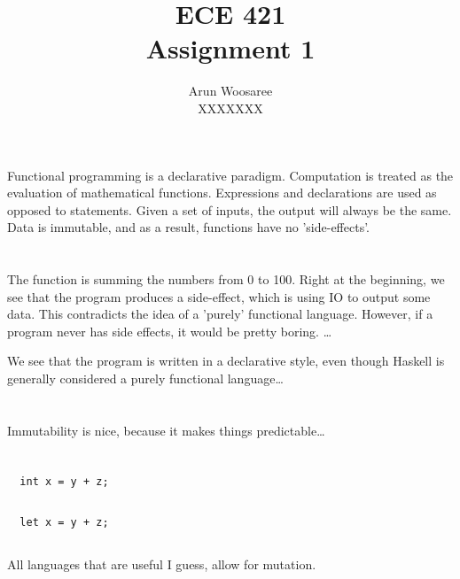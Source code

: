 \documentclass[letterpaper]{article}
\title{ECE 421 \\
Assignment 1}
\author{Arun Woosaree\\
XXXXXXX
}
\begin{document}
\maketitle %

\section{}
Functional programming is a declarative paradigm.
Computation is treated as the evaluation of mathematical functions.
Expressions and declarations are used as opposed to statements.
Given a set of inputs, the output will always be the same.
Data is immutable, and as a result,
functions have no 'side-effects'.

\section{}
The function is summing the numbers from 0 to 100.
Right at the beginning, we see that the program produces a side-effect, which
is using IO to output some data. This contradicts the idea of a 'purely'
functional language. However, if a program never has side effects, it would be
pretty boring. \dots {}

We see that the program is written in a declarative style, even though Haskell
is generally considered a purely functional language\dots


\section{}
Immutability is nice, because it makes things predictable\dots

\section{}
\begin{verbatim}
  int x = y + z;
\end{verbatim}

\subsection{}
\begin{verbatim}
  let x = y + z;
\end{verbatim}

\subsection{}
All languages that are useful I guess, allow for mutation.
\end{document}
